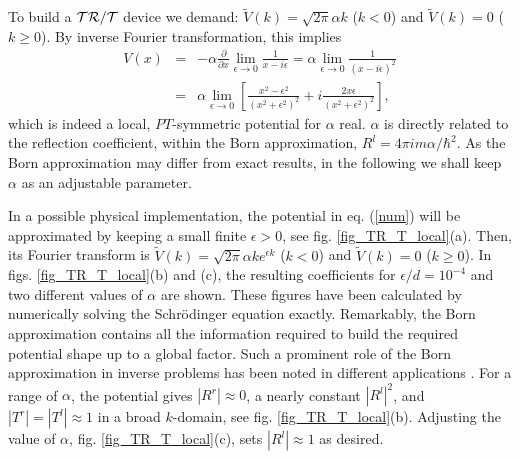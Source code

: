 To build a ${\cal{TR/T}}$ device we demand:
$\widetilde V(k) = \sqrt{2\pi} \alpha k$ ($k < 0$) and $\widetilde V(k) = 0$ ($k \ge 0$).
By inverse Fourier transformation, this implies
%
\begin{eqnarray}
  V(x) &=&
  -\alpha \frac{\partial}{\partial x} \lim_{\epsilon\to 0} \frac{1}{x - i \epsilon}
  = \alpha \lim_{\epsilon\to 0} \frac{1}{(x - i \epsilon)^2}
  \nonumber\\
  &=& \alpha \lim_{\epsilon\to 0} \left[\frac{x^2 - \epsilon^2}{(x^2 + \epsilon^2)^2} + i
  \frac{2 x\epsilon}{(x^2 + \epsilon^2)^2}\right],
  \label{num}
\end{eqnarray}
%
which is indeed a local, $PT$-symmetric potential for $\alpha$ real.
$\alpha$ is directly related to the reflection coefficient, within the Born approximation,
$R^l = 4 \pi i m \alpha/\hbar^2$. As the Born approximation may differ from exact results, in the following we shall keep $\alpha$ as an adjustable parameter.

In a possible physical implementation, the potential in eq. (\ref{num}) will
be approximated by keeping a small finite $\epsilon>0$, see fig. \ref{fig_TR_T_local}(a).
Then, its Fourier transform is
$\widetilde V(k) = \sqrt{2\pi} \alpha k e^{\epsilon k}$ ($k < 0$) and $\widetilde V(k)=0$ ($k \ge 0$).
In figs. \ref{fig_TR_T_local}(b) and (c), the resulting coefficients for $\epsilon/d=10^{-4}$ and  two different values
of $\alpha$ are shown.  These figures have been calculated by
numerically solving the Schr\"odinger equation exactly.
Remarkably, the Born approximation contains all the information required to build the required potential shape
up to a global factor.  Such a prominent role of the Born approximation in inverse problems has been noted
in different applications \cite{Snieder1990,Mostafazadeh2014,Horsley2015}. For a range of $\alpha$, the potential gives $|R^r|\approx 0$, a nearly constant $|R^l|^2$, and
$|T^r|= |T^l|\approx1$  in a broad $k$-domain, see fig. \ref{fig_TR_T_local}(b). Adjusting  the value of $\alpha$, fig. \ref{fig_TR_T_local}(c),
sets $|R^l|\approx 1$ as desired.
%
%
